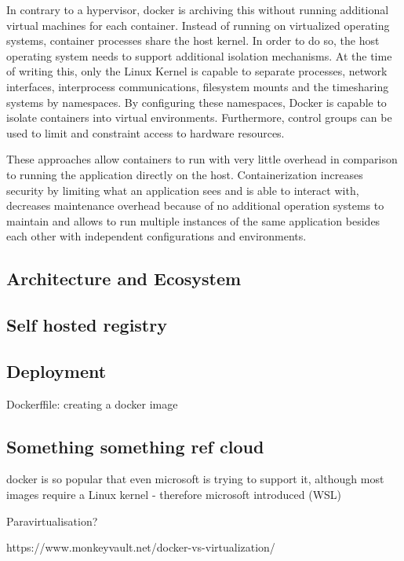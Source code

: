 In contrary to a hypervisor, docker is archiving this without running additional virtual machines for each container.
Instead of running on virtualized operating systems, container processes share the host kernel.
In order to do so, the host operating system needs to support additional isolation mechanisms.
At the time of writing this, only the Linux Kernel is capable to separate processes, network interfaces, interprocess communications, filesystem mounts and the timesharing systems by namespaces.
By configuring these namespaces, Docker is capable to isolate containers into virtual environments.
Furthermore, control groups can be used to limit and constraint access to hardware resources.
\cite{docker:overview}

These approaches allow containers to run with very little overhead in comparison to running the application directly on the host.
Containerization increases security by limiting what an application sees and is able to interact with, decreases maintenance overhead because of no additional operation systems to maintain and allows to run multiple instances of the same application besides each other with independent configurations and environments.

\subsection{Architecture and Ecosystem}
\label{docker:ecosystem}

\subsection{Self hosted registry}

\subsection{Deployment}

Dockerffile: creating a docker image

\subsection{Something something ref cloud }

docker is so popular that even microsoft is trying to support it, although most images require a Linux kernel - therefore microsoft introduced (WSL)

Paravirtualisation?

https://www.monkeyvault.net/docker-vs-virtualization/

